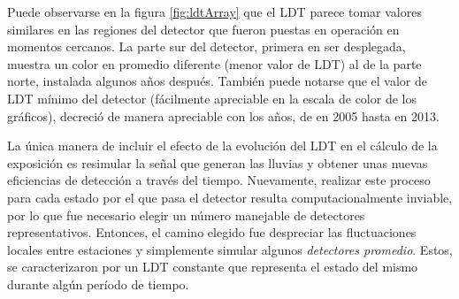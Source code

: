 	Puede observarse en la figura \ref{fig:ldtArray} que el LDT parece tomar valores similares en las regiones del detector que fueron puestas en operación en momentos cercanos.
	La parte sur del detector, primera en ser desplegada, muestra un color en promedio diferente (menor valor de LDT) al de la parte norte, instalada algunos años despu\'es.
	También puede notarse que el valor de LDT mínimo del detector (fácilmente apreciable en la escala de color de los gráficos), decreció de manera apreciable con los años, de  en 2005 hasta  en 2013.
	
	La \'unica manera de incluir el efecto de la evolución del LDT en el c\'alculo de la exposici\'on es resimular la señal que generan las lluvias y obtener unas nuevas eficiencias de detecci\'on a trav\'es del tiempo.
	Nuevamente, realizar este proceso para cada estado por el que pasa el detector resulta computacionalmente inviable, por lo que fue necesario elegir un número manejable de detectores representativos.
	Entonces, el camino elegido fue despreciar las fluctuaciones locales entre estaciones y simplemente simular algunos \emph{detectores promedio}. Estos, se caracterizaron por un LDT constante que representa el estado del mismo durante algún período de tiempo.
	
